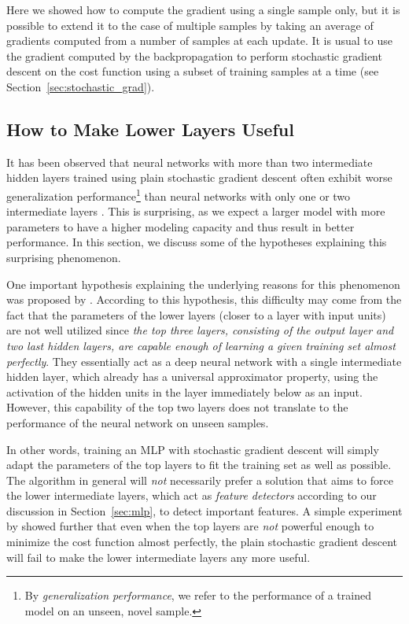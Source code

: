 \documentclass[dissertation,nocontribution]{aaltoseries}
\begin{document}
Here we showed how to compute the gradient using a single sample
only, but it is possible to extend it to the case of multiple
samples by taking an average of gradients computed from a number
of samples at each update. It is usual to use the gradient
computed by the backpropagation to perform stochastic gradient
descent on the cost function using a subset of training samples
at a time (see Section~\ref{sec:stochastic_grad}). 

\subsection{How to Make Lower Layers Useful}
\label{sec:bp_imp}

It has been observed that neural networks with more than two
intermediate hidden layers trained using plain stochastic
gradient descent often exhibit worse generalization performance\footnote{By
\textit{generalization performance}, we refer to the
performance of a trained model on an unseen, novel sample.
}
than neural networks with only one or two intermediate layers
\citep[see, e.g.][]{Bengio2007a}. This is surprising, as we
expect a larger model with more parameters to have a higher
modeling capacity and thus result in better performance. In this
section, we discuss some of the hypotheses explaining this
surprising phenomenon.

One important hypothesis explaining the underlying reasons
for this phenomenon was proposed by \citet{Bengio2007nips}.
According to this hypothesis, this difficulty may come from
the fact that the parameters of the lower layers (closer to
a layer with input units) are 
not well utilized
since
\textit{the top three layers, consisting of the output layer
and two last hidden layers, are capable enough of learning a
given training set almost perfectly}.  They essentially act
as a deep neural network with a single intermediate hidden
layer, which already has a universal approximator property,
using the activation of the hidden units in the layer
immediately below as an input. However, this capability of
the top two layers does not translate to the performance of
the neural network on unseen samples.

In other words, training an MLP with stochastic gradient descent
will simply adapt the parameters of the top layers to fit the
training set as well as possible. The algorithm in general will
\textit{not} necessarily prefer a solution that aims to force the
lower intermediate layers, which act as \textit{feature
detectors} according to our discussion in
Section~\ref{sec:mlp}, to detect important features.  A
simple experiment by \citet{Bengio2007nips} showed further
that even when the top layers are \textit{not} powerful
enough to minimize the cost function almost perfectly, the
plain stochastic gradient descent will fail to make the lower
intermediate layers any more useful.
\end{document}
